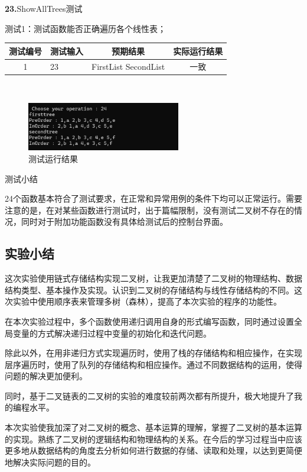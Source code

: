\documentclass[supercite]{Experimental_Report}
\theoremstyle{definition}
\begin{document}
\noindent\textbf{23.}ShowAllTrees测试
	
测试1：测试函数能否正确遍历各个线性表；

\vspace{0.5em}

\begin{tabular}{|c|p{2.7cm}|c|c|}
	\hline
	测试编号 & 测试输入 & 预期结果 & 实际运行结果 \\
	\hline
	1 & 23 & FirstList SecondList & 一致 \\
	\hline
\end{tabular}

~\

\begin{figure}[H]
 	\centering
 	\includegraphics[width=0.6\textwidth]{images/二叉树测试24.png}
 	\caption{测试运行结果}
 	\label{txlab}
 \end{figure}

测试小结

24个函数基本符合了测试要求，在正常和异常用例的条件下均可以正常运行。需要注意的是，在对某些函数进行测试时，出于篇幅限制，没有测试二叉树不存在的情况，同时对于附加功能函数没有具体给测试后的控制台界面。

\subsection{实验小结}

这次实验使用链式存储结构实现二叉树，让我更加清楚了二叉树的物理结构、数据结构类型、基本操作及实现。认识到二叉树的存储结构与线性存储结构的不同。这次实验中使用顺序表来管理多树（森林），提高了本次实验的程序的功能性。

在本次实验过程中，多个函数使用递归调用自身的形式编写函数，同时通过设置全局变量的方式解决递归过程中变量的初始化和迭代问题。

除此以外，在用非递归方式实现遍历时，使用了栈的存储结构和相应操作，在实现层序遍历时，使用了队列的存储结构和相应操作。通过不同数据结构的运用，使得问题的解决更加便利。

同时，基于二叉链表的二叉树的实验的难度较前两次都有所提升，极大地提升了我的编程水平。

本次实验使我加深了对二叉树的概念、基本运算的理解，掌握了二叉树的基本运算的实现。熟练了二叉树的逻辑结构和物理结构的关系。在今后的学习过程当中应该更多地从数据结构的角度去分析如何进行数据的存储、读取和处理，以达到更简便地解决实际问题的目的。
\end{document}
